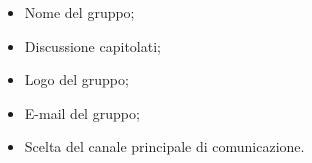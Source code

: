 \begin{itemize}
	\item Nome del gruppo;
	\item Discussione capitolati;
	\item Logo del gruppo;
	\item E-mail del gruppo;
	\item Scelta del canale principale di comunicazione.
	
\end{itemize}